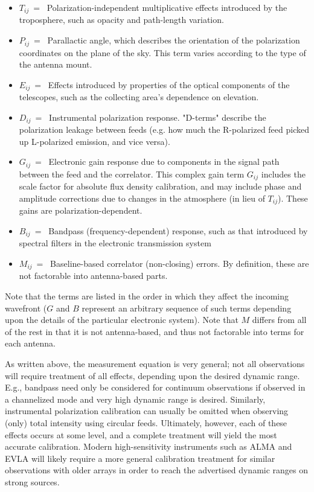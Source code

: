 \begin{itemize}
   \item $T_{ij}~=~$ Polarization-independent multiplicative effects
     introduced by the troposphere, such as opacity and path-length
     variation. 
   \item  $P_{ij}~=~$ Parallactic angle, which describes the
     orientation of the polarization coordinates on the plane of the
     sky. This term varies according to the type of the antenna mount. 
   \item  $E_{ij}~=~$ Effects introduced by properties of the optical
     components of the telescopes, such as the collecting area's
     dependence on elevation. 
   \item  $D_{ij}~=~$ Instrumental polarization response. "D-terms"
     describe the polarization leakage between feeds (e.g. how much the
     R-polarized feed picked up L-polarized emission, and vice versa). 
   \item  $G_{ij}~=~$ Electronic gain response due to components in
     the signal path between the feed and the correlator. This complex
     gain term $G_{ij}$ includes the scale factor for absolute flux
     density calibration, and may include phase and amplitude
     corrections due to changes in the atmosphere (in lieu of
     $T_{ij}$). These gains are polarization-dependent. 
   \item  $B_{ij}~=~$ Bandpass (frequency-dependent) response, such as
     that introduced by spectral filters in the electronic transmission
     system 
   \item  $M_{ij}~=~$ Baseline-based correlator (non-closing)
     errors. By definition, these are not factorable into antenna-based
     parts.  
\end{itemize}

Note that the terms are listed in the order in which they affect the
incoming wavefront ($G$ and $B$ represent an arbitrary sequence of
such terms depending upon the details of the particular electronic
system). Note that $M$ differs from all of the rest in that it is not
antenna-based, and thus not factorable into terms for each antenna. 

As written above, the measurement equation is very general; not all
observations will require treatment of all effects, depending upon the
desired dynamic range. E.g., bandpass need only be considered for
continuum observations if observed in a channelized mode and very high
dynamic range is desired. Similarly, instrumental polarization
calibration can usually be omitted when observing (only) total
intensity using circular feeds. Ultimately, however, each of these
effects occurs at some level, and a complete treatment will yield the
most accurate calibration. Modern high-sensitivity instruments such as
ALMA and EVLA will likely require a more general calibration treatment
for similar observations with older arrays in order to reach the
advertised dynamic ranges on strong sources. 

